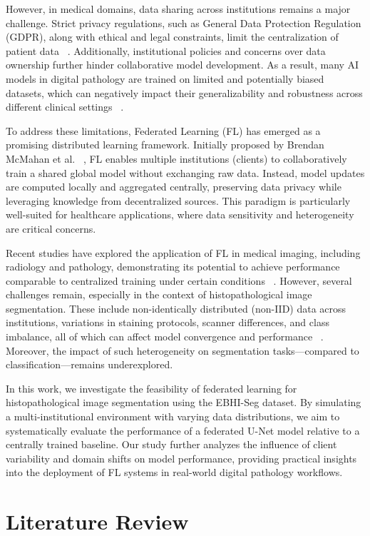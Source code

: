 \documentclass[conference]{IEEEtran}
\begin{document}
However, in medical domains, data sharing across institutions remains a major challenge. Strict privacy regulations, such as General Data Protection Regulation (GDPR), along with ethical and legal constraints, limit the centralization of patient data ~\cite{2}. Additionally, institutional policies and concerns over data ownership further hinder collaborative model development. As a result, many AI models in digital pathology are trained on limited and potentially biased datasets, which can negatively impact their generalizability and robustness across different clinical settings ~\cite{3}.

To address these limitations, Federated Learning (FL) has emerged as a promising distributed learning framework. Initially proposed by Brendan McMahan et al. ~\cite{4}, FL enables multiple institutions (clients) to collaboratively train a shared global model without exchanging raw data. Instead, model updates are computed locally and aggregated centrally, preserving data privacy while leveraging knowledge from decentralized sources. This paradigm is particularly well-suited for healthcare applications, where data sensitivity and heterogeneity are critical concerns.

Recent studies have explored the application of FL in medical imaging, including radiology and pathology, demonstrating its potential to achieve performance comparable to centralized training under certain conditions ~\cite{5,6}. However, several challenges remain, especially in the context of histopathological image segmentation. These include non-identically distributed (non-IID) data across institutions, variations in staining protocols, scanner differences, and class imbalance, all of which can affect model convergence and performance ~\cite{7}. Moreover, the impact of such heterogeneity on segmentation tasks—compared to classification—remains underexplored.

In this work, we investigate the feasibility of federated learning for histopathological image segmentation using the EBHI-Seg dataset. By simulating a multi-institutional environment with varying data distributions, we aim to systematically evaluate the performance of a federated U-Net model relative to a centrally trained baseline. Our study further analyzes the influence of client variability and domain shifts on model performance, providing practical insights into the deployment of FL systems in real-world digital pathology workflows.


\section{Literature Review}
\end{document}

